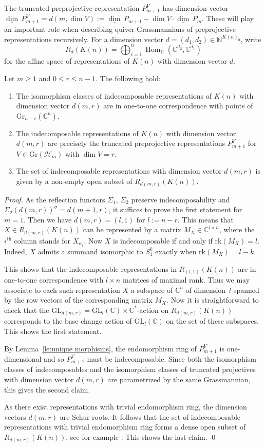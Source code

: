 \documentclass[smallextended,envcountsect,envcountsame]{svjour3}
\numberwithin{equation}{section}
\newcommand{\CC}{\mathbb{C}}
\newcommand{\NN}{\mathbb{N}}
\newcommand{\cH}{\mathcal{H}}
\newcommand\udim{{\underline{\dim}\, }}
\newcommand{\Gr}{\mathrm{Gr}}
\newcommand{\GL}{\mathrm{GL}}
\newcommand{\Hom}{\operatorname{Hom}}
\newcommand{\rk}{\mathrm{rk}}
\begin{document}
The truncated preprojective representation $P_{m+1}^V$ has dimension vector  $\udim P_{m+1}^V=d(m,\dim V):=\udim P_{m+1}-\dim V\cdot\udim P_m$.
These will play an important role when describing quiver Grassmannians of preprojective representations recursively.
For a dimension vector $d=(d_1,d_2)\in\NN^{K(n)_0}$, write 
\[R_d(K(n))=\bigoplus_{i=1}^n\Hom_{\CC}(\CC^{d_2},\CC^{d_1})\]
for the affine space of representations of $K(n)$ with dimension vector $d$. 
\begin{proposition}
  \label{pro:indecomposables}
  Let $m\geq 1$ and $0\le r\le n-1$.
  The following hold:
  \begin{enumerate}
    \item The isomorphism classes of indecomposable representations of $K(n)$ with dimension vector $d(m,r)$ are in one-to-one correspondence with points of $\Gr_{n-r}(\CC^n)$.
    \item The indecomposable representations of $K(n)$ with dimension vector $d(m,r)$ are precisely the truncated preprojective representations $P_{m+1}^V$ for $V\in \Gr(\cH_m)$ with $\dim V=r$. 
    \item The set of indecomposable representations with dimension vector $d(m,r)$ is given by a non-empty open subset of $R_{d(m,r)}(K(n))$. 
  \end{enumerate}
\end{proposition}
\begin{proof}
  As the reflection functors $\Sigma_1,\,\Sigma_2$ preserve indecomposability and $\Sigma_2(d(m,r))^\sigma=d(m+1,r)$, it suffices to prove the first statement for $m=1$.
  Then we have $d(m,r)=(l,1)$ for $l:=n-r$.
  This means that $X\in R_{d(m,r)}(K(n))$ can be represented by a matrix $M_X\in\CC^{l\times n}$, where the $i^{\mathrm{th}}$ column stands for $X_{\alpha_i}$.
  Now $X$ is indecomposable if and only if $\rk(M_X)=l$.
  Indeed, $X$ admits a summand isomorphic to $S_1^k$ exactly when $\rk(M_X)=l-k$.

  This shows that the indecomposable representations in $R_{(l,1)}(K(n))$ are in one-to-one correspondence with $l\times n$ matrices of maximal rank.
  Thus we may associate to each such representation $X$ a subspace of $\CC^n$ of dimension~$l$ spanned by the row vectors of the corresponding matrix $M_X$.
  Now it is straightforward to check that the $\GL_{d(m,r)}=\GL_l(\CC)\times\CC^\ast$-action on $R_{d(m,r)}(K(n))$ corresponds to the base change action of $\GL_l(\CC)$ on the set of these subspaces.
  This shows the first statement.

  By Lemma~\ref{le:unique morphisms}, the endomorphism ring of $P_{m+1}^V$ is one-dimensional and so $P_{m+1}^V$ must be indecomposable.
  Since both the isomorphism classes of indecomposables and the isomorphism classes of truncated projectives with dimension vector $d(m,r)$ are parametrized by the same Grassmannian, this gives the second claim.

  As there exist representations with trivial endomorphism ring, the dimension vectors $d(m,r)$ are Schur roots.
  It follows that the set of indecomposable representations with trivial endomorphism ring forms a dense open subset of $R_{d(m,r)}(K(n))$, see for example \cite[Theorem 2.2]{sch}.
  This shows the last claim.
\qed\end{proof}
\end{document}
